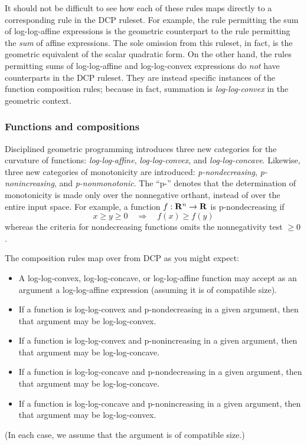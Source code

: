 \documentclass[12pt]{article}
\begin{document}
It should not be difficult to see how each of these rules maps directly to a corresponding
rule in the DCP ruleset. For example, the rule permitting the sum of log-log-affine expressions
is the geometric counterpart to the rule permitting the \emph{sum} of affine expressions.
The sole omission from this ruleset, in fact, is the geometric equivalent of the scalar
quadratic form. On the other hand, the rules permitting sums of log-log-affine and
log-log-convex expressions do \emph{not} have counterparts in the DCP ruleset. They are
instead specific instances of the function composition rules; because in fact, 
summation is \emph{log-log-convex} in the geometric context.

\subsubsection{Functions and compositions}
\label{sec:gp-functions}

Disciplined geometric programming introduces three new categories 
for the curvature of functions: \emph{log-log-affine},
\emph{log-log-convex}, and \emph{log-log-concave}. Likewise,
three new categories of monotonicity are introduced: \emph{p-nondecreasing},
\emph{p-nonincreasing}, and \emph{p-nonmonotonic}. The ``p-'' denotes
that the determination of monotonicity is made only over the nonnegative
orthant, instead of over the entire input space.
For example, a function $f:\Rn\rightarrow\R$ is p-nondecreasing if
\begin{equation}
	x \geq y \geq 0 \quad\Longrightarrow\quad f(x) \geq f(y)
\end{equation}
whereas the criteria for nondecreasing functions omits the nonnegativity test $\geq 0$.

The composition rules map over from DCP as you might expect:
\begin{itemize}
\item A log-log-convex, log-log-concave, or log-log-affine function may accept as an argument
a log-log-affine expression (assuming it is of compatible size).
\item If a function is log-log-convex and p-nondecreasing in a given argument,
then that argument may be log-log-convex.
\item If a function is log-log-convex and p-nonincreasing in a given argument,
then that argument may be log-log-concave.
\item If a function is log-log-concave and p-nondecreasing in a given argument,
then that argument may be log-log-concave.
\item If a function is log-log-concave and p-nonincreasing in a given argument,
then that argument may be log-log-convex.
\end{itemize}
(In each case, we assume that the argument is of compatible size.)
\end{document}
